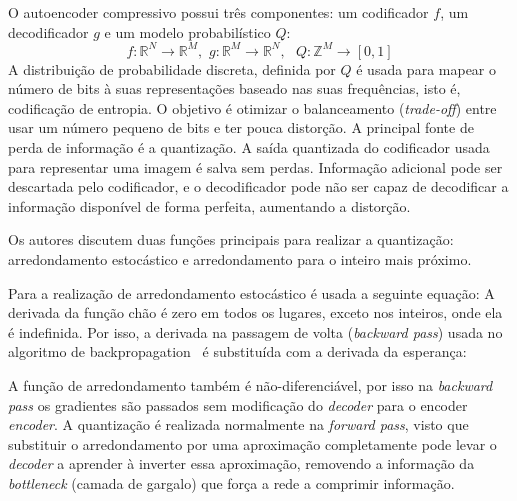 O autoencoder compressivo possui três componentes: um codificador $f$, um decodificador $g$ e um modelo probabilístico $Q$:
$$f :  \mathbb{R}^N \to \mathbb{R}^M\textrm{,}\,\,\, g : \mathbb{R}^M \to \mathbb{R}^N\textrm{, }\,\,\, Q : \mathbb{Z}^M \to [0, 1]$$
A distribuição de probabilidade discreta, definida por $Q$ é usada para mapear o número de bits à suas representações baseado nas suas frequências, isto é, codificação de entropia. O objetivo é otimizar o balanceamento (\textit{trade-off}) entre usar um número pequeno de bits e ter pouca distorção. A principal fonte de perda de informação é a quantização. A saída quantizada do codificador usada para representar uma imagem é salva sem perdas. Informação adicional pode ser descartada pelo codificador, e o decodificador pode não ser capaz de decodificar a informação disponível de forma perfeita, aumentando a distorção.

Os autores discutem duas funções principais para realizar a quantização: arredondamento estocástico e arredondamento para o inteiro mais próximo.

Para a realização de arredondamento estocástico é usada a seguinte equação:  
A derivada da função chão é zero em todos os lugares, exceto nos inteiros, onde ela é indefinida. Por isso, a derivada na passagem de volta (\textit{backward pass}) usada no algoritmo de backpropagation~\cite{rumelhart1988learning} é substituída com a derivada da esperança: 

A função de arredondamento também é não-diferenciável, por isso na \textit{backward pass} os gradientes são passados sem modificação do \textit{decoder} para o encoder \textit{encoder}. A quantização é realizada normalmente na \textit{forward pass}, visto que substituir o arredondamento por uma aproximação completamente pode levar o \textit{decoder} a aprender à inverter essa aproximação, removendo a informação da \textit{bottleneck} (camada de gargalo) que força a rede a comprimir informação.
